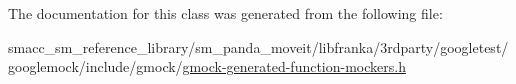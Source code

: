 The documentation for this class was generated from the following file\+:\begin{DoxyCompactItemize}
\item 
smacc\+\_\+sm\+\_\+reference\+\_\+library/sm\+\_\+panda\+\_\+moveit/libfranka/3rdparty/googletest/googlemock/include/gmock/\hyperlink{gmock-generated-function-mockers_8h}{gmock-\/generated-\/function-\/mockers.\+h}\end{DoxyCompactItemize}
